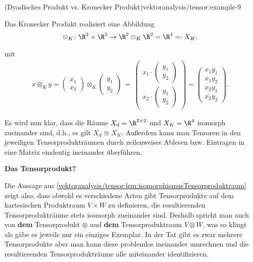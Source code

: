 \documentclass[letterpaper,10pt,german]{jupyterBook}
\begin{document}
\begin{example}{(Dyadisches Produkt vs. Kronecker Produkt)}{vektoranalysis/tensor:example-9}
\par
Das Kronecker Produkt realisiert eine Abbildung
\begin{align*}
\otimes_K \colon \R^2 \times \R^2 \rightarrow \R^2 \otimes_K \R^2 = \R^{4} =: X_K,
\end{align*}
\par
mit
\begin{align*}
x \otimes_K y =
\begin{pmatrix}
x_1 \\ x_2
\end{pmatrix} \otimes_K 
\begin{pmatrix}
y_1 \\ y_2
\end{pmatrix}
\, = \, 
\begin{pmatrix}
x_1 \cdot \begin{pmatrix} y_1 \\ y_2 \end{pmatrix} \\ 
x_2 \cdot \begin{pmatrix} y_1 \\ y_2 \end{pmatrix}
\end{pmatrix}
= 
\begin{pmatrix}
x_1y_1\\
x_1y_2\\
x_2y_1\\
x_2y_2
\end{pmatrix}.
\end{align*}
\par
Es wird nun klar, dass die Räume \(X_d = \R^{2 \times 2}\) und \(X_K = \R^4\) isomorph zueinander sind, d.h., es gilt \(X_d \cong X_K\).
Außerdem kann man Tensoren in den jeweiligen Tensorprodukträumen durch zeilenweises Ablesen bzw. Eintragen in eine Matrix eindeutig ineinander überführen.
\end{example}

\par
\textbf{Das Tensorprodukt?}

\par
Die Aussage aus \cref{vektoranalysis/tensor:lem:isomorphismusTensorproduktraum} zeigt also, dass obwohl es verschiedene Arten gibt Tensorprodukte auf dem kartesischen Produktraum \(V \times W\) zu definieren, die resultierenden Tensorprodukträume stets isomorph zueinander sind.
Deshalb spricht man auch von \textbf{dem} Tensorprodukt \(\otimes\) und \textbf{dem} Tensorproduktraum \(V \otimes W\), was so klingt als gäbe es jeweils nur ein einziges Exemplar.
In der Tat gibt es zwar mehrere Tensorprodukte aber man kann diese problemlos ineinander umrechnen und die resultierenden Tensorprodukträume alle miteinander identifizieren.
\end{document}

